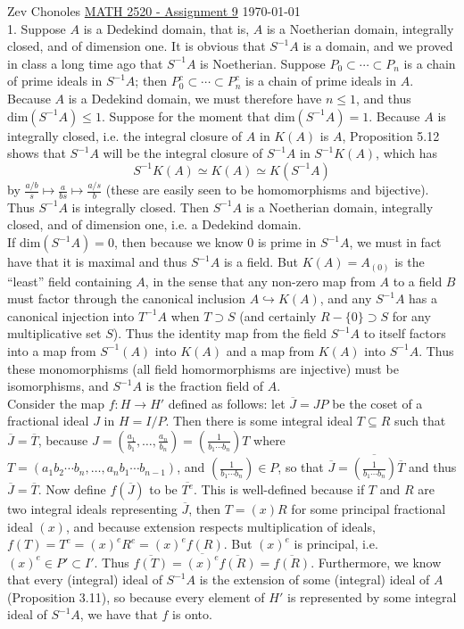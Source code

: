 \documentclass[11pt]{article}
\begin{document}
Zev Chonoles \hfill 
\underline{MATH 2520 - Assignment 9} \hfill \today\\

\num{1.} Suppose $A$ is a Dedekind domain, that is, $A$ is a Noetherian domain, integrally closed, and of dimension one. It is obvious that $S^{-1}A$ is a domain, and we proved in class a long time ago that $S^{-1}A$ is Noetherian. Suppose $P_0\subset\cdots\subset P_n$ is a chain of prime ideals in $S^{-1}A$; then $P_0^c\subset\cdots\subset P_n^c$ is a chain of prime ideals in $A$. Because $A$ is a Dedekind domain, we must therefore have $n\leq 1$, and thus $\text{dim}(S^{-1}A)\leq 1$. Suppose for the moment that $\text{dim}(S^{-1}A)=1$. Because $A$ is integrally closed, i.e. the integral closure of $A$ in $K(A)$ is $A$, Proposition 5.12 shows that $S^{-1}A$ will be the integral closure of $S^{-1}A$ in $S^{-1}K(A)$, which has
\[S^{-1}K(A)\simeq K(A)\simeq K(S^{-1}A)\]
by $\frac{a/b}{s}\mapsto\frac{a}{bs}\mapsto\frac{a/s}{b}$ (these are easily seen to be homomorphisms and bijective). Thus $S^{-1}A$ is integrally closed. Then $S^{-1}A$ is a Noetherian domain, integrally closed, and of dimension one, i.e. a Dedekind domain.\\

If $\text{dim}(S^{-1}A)=0$, then because we know 0 is prime in $S^{-1}A$, we must in fact have that it is maximal and thus $S^{-1}A$ is a field. But $K(A)=A_{(0)}$ is the ``least'' field containing $A$, in the sense that any non-zero map from $A$ to a field $B$ must factor through the canonical inclusion $A\hookrightarrow K(A)$, and any $S^{-1}A$ has a canonical injection into $T^{-1}A$ when $T\supset S$ (and certainly $R-\{0\}\supset S$ for any multiplicative set $S$). Thus the identity map from the field $S^{-1}A$ to itself factors into a map from $S^{-1}(A)$ into $K(A)$ and a map from $K(A)$ into $S^{-1}A$. Thus these monomorphisms (all field homormorphisms are injective) must be isomorphisms, and $S^{-1}A$ is the fraction field of $A$. \\

Consider the map $f:H\rightarrow H'$ defined as follows: let $\overline{J}=JP$ be the coset of a fractional ideal $J$ in $H=I/P$. Then there is some integral ideal $T\subseteq R$ such that $\overline{J}=\overline{T}$, because $J=(\frac{a_1}{b_1},\ldots,\frac{a_n}{b_n})=(\frac{1}{b_1\cdots b_n})T$ where $T=(a_1b_2\cdots b_n,\ldots,a_nb_1\cdots b_{n-1})$, and $(\frac{1}{b_1\cdots b_n})\in P$, so that $\overline{J}=\overline{(\frac{1}{b_1\cdots b_n})}\overline{T}$ and thus $\overline{J}=\overline{T}$. Now define $f(\overline{J})$ to be $\overline{T^e}$. This is well-defined because if $T$ and $R$ are two integral ideals representing $\overline{J}$, then $T=(x)R$ for some principal fractional ideal $(x)$, and because extension respects multiplication of ideals, $f(T)=T^e=(x)^eR^e=(x)^ef(R)$. But $(x)^e$ is principal, i.e. $(x)^e\in P'\subset I'$. Thus $\overline{f(T)}=\overline{(x)^e}\overline{f(R)}=\overline{f(R)}$. Furthermore, we know that every (integral) ideal of $S^{-1}A$ is the extension of some (integral) ideal of $A$ (Proposition 3.11), so because every element of $H'$ is represented by some integral ideal of $S^{-1}A$, we have that $f$ is onto.\\
\end{document}
